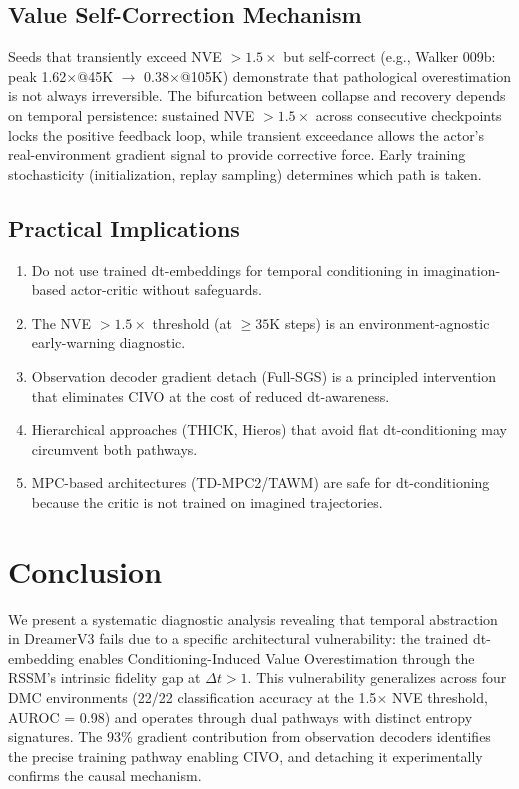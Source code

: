 \documentclass[10pt,letterpaper]{article}
\begin{document}
\subsection{Value Self-Correction Mechanism}

Seeds that transiently exceed NVE $> 1.5\times$ but self-correct (e.g., Walker 009b: peak 1.62$\times$@45K $\to$ 0.38$\times$@105K) demonstrate that pathological overestimation is not always irreversible. The bifurcation between collapse and recovery depends on temporal persistence: sustained NVE $> 1.5\times$ across consecutive checkpoints locks the positive feedback loop, while transient exceedance allows the actor's real-environment gradient signal to provide corrective force. Early training stochasticity (initialization, replay sampling) determines which path is taken.

\subsection{Practical Implications}

\begin{enumerate}[nosep]
\item Do not use trained dt-embeddings for temporal conditioning in imagination-based actor-critic without safeguards.
\item The NVE $> 1.5\times$ threshold (at $\geq 35$K steps) is an environment-agnostic early-warning diagnostic.
\item Observation decoder gradient detach (Full-SGS) is a principled intervention that eliminates CIVO at the cost of reduced dt-awareness.
\item Hierarchical approaches (THICK, Hieros) that avoid flat dt-conditioning may circumvent both pathways.
\item MPC-based architectures (TD-MPC2/TAWM) are safe for dt-conditioning because the critic is not trained on imagined trajectories.
\end{enumerate}

\section{Conclusion}

We present a systematic diagnostic analysis revealing that temporal abstraction in DreamerV3 fails due to a specific architectural vulnerability: the trained dt-embedding enables Conditioning-Induced Value Overestimation through the RSSM's intrinsic fidelity gap at $\Delta t > 1$. This vulnerability generalizes across four DMC environments (22/22 classification accuracy at the 1.5$\times$ NVE threshold, AUROC = 0.98) and operates through dual pathways with distinct entropy signatures. The 93\% gradient contribution from observation decoders identifies the precise training pathway enabling CIVO, and detaching it experimentally confirms the causal mechanism.
\end{document}
